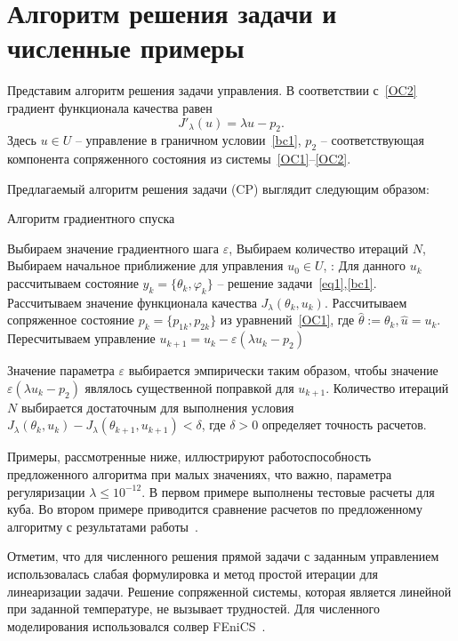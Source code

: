 \section{Алгоритм решения задачи и численные примеры}\label{sec:experiments}
Представим алгоритм решения задачи управления.
В соответствии с~\eqref{OC2} градиент функционала качества равен
\[
    J'_\lambda (u) = \lambda u - p_2.
\]
Здесь $u\in U$ -- управление в граничном условии~\eqref{bc1}, $p_2$ -- соответствующая компонента
сопряженного состояния из системы~\eqref{OC1}--\eqref{OC2}.

Предлагаемый алгоритм решения задачи (CP) выглядит следующим образом:
\begin{algorithm}[H]
    \caption{Алгоритм градиентного спуска}
    \begin{algorithmic}[1]
        \State Выбираем значение градиентного шага $\varepsilon$,
        \State Выбираем количество итераций $N$,
        \State Выбираем начальное приближение для управления $u_0 \in U$,
            :
            \State Для данного $u_k$ рассчитываем состояние $y_k = \{\theta_k, \varphi_k\}$ --
            решение задачи~\eqref{eq1},\eqref{bc1}.
            \State Рассчитываем значение функционала качества $J_\lambda(\theta_k, u_k)$.
            \State Рассчитываем сопряженное состояние $p_k=\{p_{1k},p_{2k}\}$ из уравнений~\eqref{OC1},
            где $ \hat{\theta} := \theta_k, \hat{u}=u_k$.
            \State Пересчитываем управление $u_{k+1} = u_k - \varepsilon (\lambda u_k - p_2)$
        \EndFor
    \end{algorithmic}
\end{algorithm}
Значение параметра $\varepsilon$ выбирается эмпирически таким образом, чтобы значение
$\varepsilon (\lambda u_k - p_2)$ являлось существенной поправкой для $u_{k+1}$.
Количество итераций $N$ выбирается достаточным для выполнения условия
$J_\lambda(\theta_k, u_k) - J_\lambda(\theta_{k+1}, u_{k+1}) < \delta$, где $\delta>0$ определяет точность расчетов.

Примеры, рассмотренные ниже, иллюстрируют работоспособность предложенного алгоритма при
малых значениях, что важно, параметра регуляризации $\lambda \leq 10^{-12}.$
В первом примере выполнены тестовые расчеты для куба.
Во втором примере приводится сравнение расчетов по
предложенному алгоритму с результатами работы~\cite{CNSNS19}.


Отметим, что для численного решения прямой задачи с заданным управлением использовалась слабая формулировка
и метод простой итерации для линеаризации задачи.
Решение сопряженной системы, которая является линейной при заданной температуре, не вызывает трудностей.
Для численного моделирования использовался солвер FEniCS~\cite{fenics, dolfin}.

